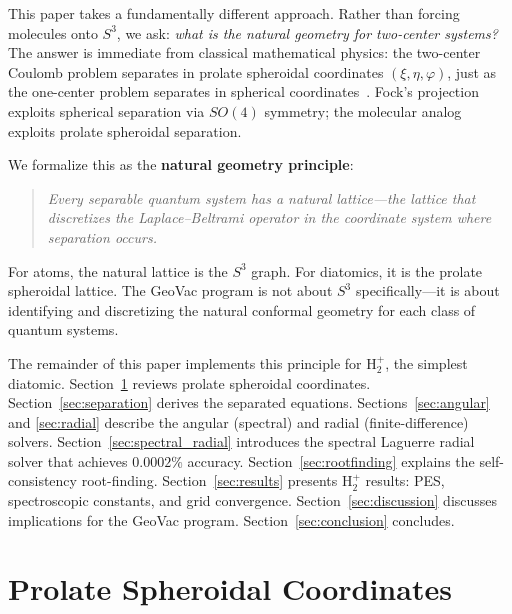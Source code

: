 \documentclass[aps,pra,twocolumn,superscriptaddress,longbibliography]{revtex4-2}
\begin{document}
This paper takes a fundamentally different approach.  Rather than
forcing molecules onto $S^3$, we ask: \emph{what is the natural
geometry for two-center systems?}  The answer is immediate from
classical mathematical physics: the two-center Coulomb problem
separates in prolate spheroidal coordinates $(\xi, \eta, \varphi)$,
just as the one-center problem separates in spherical
coordinates~\cite{Bates1953, Morse1953}.  Fock's projection exploits
spherical separation via $SO(4)$ symmetry; the molecular analog
exploits prolate spheroidal separation.

We formalize this as the \textbf{natural geometry principle}:
\begin{quote}
\emph{Every separable quantum system has a natural lattice---the
lattice that discretizes the Laplace--Beltrami operator in the
coordinate system where separation occurs.}
\end{quote}
For atoms, the natural lattice is the $S^3$ graph.  For diatomics,
it is the prolate spheroidal lattice.  The GeoVac program is not
about $S^3$ specifically---it is about identifying and discretizing
the natural conformal geometry for each class of quantum systems.

The remainder of this paper implements this principle for H$_2^+$,
the simplest diatomic.  Section~\ref{sec:coords} reviews prolate
spheroidal coordinates.  Section~\ref{sec:separation} derives the
separated equations.  Sections~\ref{sec:angular} and \ref{sec:radial}
describe the angular (spectral) and radial (finite-difference) solvers.
Section~\ref{sec:spectral_radial} introduces the spectral Laguerre
radial solver that achieves $0.0002\%$ accuracy.
Section~\ref{sec:rootfinding} explains the self-consistency
root-finding.  Section~\ref{sec:results} presents H$_2^+$ results:
PES, spectroscopic constants, and grid convergence.
Section~\ref{sec:discussion} discusses implications for the GeoVac
program.  Section~\ref{sec:conclusion} concludes.


\section{Prolate Spheroidal Coordinates}
\label{sec:coords}
\end{document}
